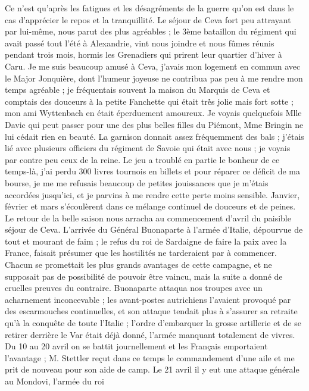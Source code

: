 \documentclass[12pt]{article}
\begin{document}
 Ce n’est qu’après les fatigues et les désagréments de la
guerre qu’on est dans le cas d’apprécier le repos et la tranquillité. Le séjour de Ceva fort peu
attrayant par lui-même, nous parut des plus agréables ; le 3ème bataillon du régiment qui avait
passé tout l’été à Alexandrie, vint nous joindre et nous fûmes réunis pendant trois mois, hormis les
Grenadiers qui prirent leur quartier d’hiver à Caru. Je me suis beaucoup amusé à Ceva, j’avais mon
logement en commun avec le Major Jonquière, dont l’humeur joyeuse ne contribua pas peu à me rendre
mon temps agréable ; je fréquentais souvent la maison du Marquis de Ceva et comptais des douceurs à
la petite Fanchette qui était trè́s jolie mais fort sotte ; mon ami Wyttenbach en était éperduement
amoureux. Je voyais quelquefois Mlle Davic qui peut passer pour une des plus belles filles du
Piémont, Mme Bringin ne lui cédait rien en beauté. La garnison donnait assez fréquemment des bals ;
j’étais lié avec plusieurs officiers du régiment de Savoie qui était avec nous ; je voyais par
contre peu ceux de la reine. Le jeu a troublé en partie le bonheur de ce temps-là, j’ai perdu 300
livres tournois en billets et pour réparer ce déficit de ma bourse, je me me refusais beaucoup de
petites jouissances que je m’étais accordées jusqu’ici, et je parvins à me rendre cette perte moins
sensible. Janvier, février et mars s’écoulèrent dans ce mélange continuel de douceurs et de peines.
Le retour de la belle saison nous arracha au commencement d’avril du paisible séjour de Ceva.
L’arrivée du Général Buonaparte à l’armée d’Italie, dépourvue de tout et mourant de faim ; le refus
du roi de Sardaigne de faire la paix avec la France, faisait présumer que les hostilités ne
tarderaient par à commencer. Chacun se promettait les plus grands avantages de cette campagne, et ne
supposait pas de possibilité de pouvoir être vaincu, mais la suite a donné de cruelles preuves du
contraire. Buonaparte attaqua nos troupes avec un acharnement inconcevable ; les avant-postes
autrichiens l’avaient provoqué par des escarmouches continuelles, et son attaque tendait plus à
s’assurer sa retraite qu’à la conquête de toute l’Italie ; l’ordre d’embarquer la grosse artillerie
et de se retirer derrière le Var était déjà donné, l’armée manquant totalement de vivres. Du 10 au
20 avril on se battit journellement et les Français emportaient l’avantage ; M. Stettler reçut dans
ce temps le commandement d’une aile et me prit de nouveau pour son aide de camp. Le 21 avril il y
eut une attaque générale au Mondovi, l’armée du roi
\end{document}
